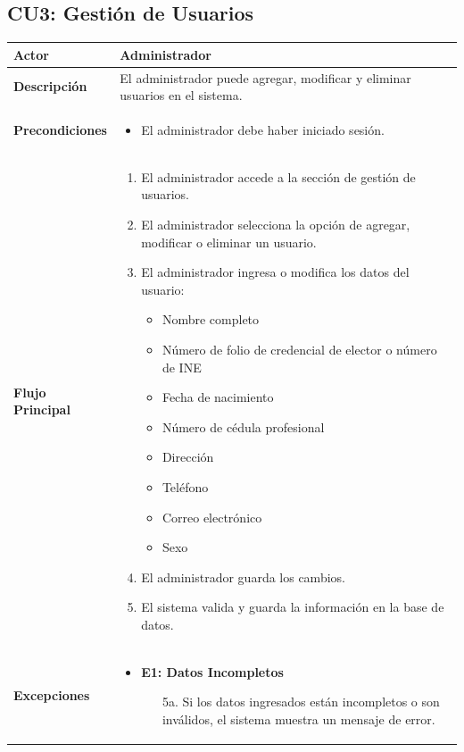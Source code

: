\documentclass{article}
\begin{document}
\newpage
\subsection{CU3: Gestión de Usuarios}
\begin{longtable}{|l|p{10cm}|}
\hline
\textbf{Actor} & Administrador \\ \hline
\textbf{Descripción} & El administrador puede agregar, modificar y eliminar usuarios en el sistema. \\ \hline
\textbf{Precondiciones} & 
\begin{itemize}
    \item El administrador debe haber iniciado sesión.
\end{itemize} \\ \hline
\textbf{Flujo Principal} & 
\begin{enumerate}
    \item El administrador accede a la sección de gestión de usuarios.
    \item El administrador selecciona la opción de agregar, modificar o eliminar un usuario.
    \item El administrador ingresa o modifica los datos del usuario:
    \begin{itemize}
        \item Nombre completo
        \item Número de folio de credencial de elector o número de INE
        \item Fecha de nacimiento
        \item Número de cédula profesional
        \item Dirección
        \item Teléfono
        \item Correo electrónico
        \item Sexo
    \end{itemize}
    \item El administrador guarda los cambios.
    \item El sistema valida y guarda la información en la base de datos.
\end{enumerate} \\ \hline
\textbf{Excepciones} & 
\begin{itemize}
    \item \textbf{E1: Datos Incompletos}
    \begin{enumerate}
        \item[5a.] Si los datos ingresados están incompletos o son inválidos, el sistema muestra un mensaje de error.

\end{enumerate}
\end{itemize}
\end{longtable}
\end{document}
